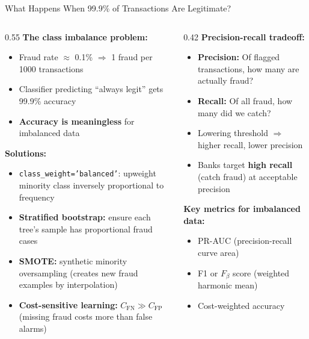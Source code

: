 \documentclass[8pt,aspectratio=169]{beamer}
\newenvironment{compactlist}{%
  \begin{itemize}%
    \setlength{\itemsep}{2pt}%
    \setlength{\parskip}{0pt}%
    \setlength{\parsep}{0pt}%
}{%
  \end{itemize}%
}
\newcommand{\highlight}[1]{\textcolor{mlorange}{\textbf{#1}}}
\begin{document}
\begin{frame}{What Happens When 99.9\% of Transactions Are Legitimate?}
\begin{columns}[T]
\begin{column}{0.55\textwidth}
\small
\textbf{The class imbalance problem:}
\begin{compactlist}
\item Fraud rate $\approx$ 0.1\% $\Rightarrow$ 1 fraud per 1000 transactions
\item Classifier predicting ``always legit'' gets 99.9\% accuracy
\item \highlight{Accuracy is meaningless} for imbalanced data
\end{compactlist}

\vspace{0.3em}
\footnotesize
\textbf{Solutions:}
\begin{compactlist}
\item \texttt{class\_weight='balanced'}: upweight minority class inversely proportional to frequency
\item \textbf{Stratified bootstrap:} ensure each tree's sample has proportional fraud cases
\item \textbf{SMOTE:} synthetic minority oversampling (creates new fraud examples by interpolation)
\item \textbf{Cost-sensitive learning:} $C_{\text{FN}} \gg C_{\text{FP}}$ (missing fraud costs more than false alarms)
\end{compactlist}
\end{column}
\begin{column}{0.42\textwidth}
\footnotesize
\textbf{Precision-recall tradeoff:}
\begin{compactlist}
\item \textbf{Precision:} Of flagged transactions, how many are actually fraud?
\item \textbf{Recall:} Of all fraud, how many did we catch?
\item Lowering threshold $\Rightarrow$ higher recall, lower precision
\item Banks target \highlight{high recall} (catch fraud) at acceptable precision
\end{compactlist}

\vspace{0.5em}
\textbf{Key metrics for imbalanced data:}
\begin{compactlist}
\item PR-AUC (precision-recall curve area)
\item F1 or $F_\beta$ score (weighted harmonic mean)
\item Cost-weighted accuracy
\end{compactlist}
\end{column}
\end{columns}


\end{frame}
\end{document}
